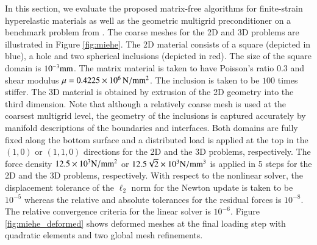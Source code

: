 \documentclass[AMA,STIX1COL]{WileyNJD-v2}
\begin{document}
In this section, we evaluate the proposed matrix-free algorithms for finite-strain hyperelastic materials as well as the geometric multigrid preconditioner on a benchmark problem from \cite{Miehe2007}. The coarse meshes for the 2D and 3D problems are illustrated in Figure \ref{fig:miehe}. The 2D material consists of a square (depicted in blue), a hole and two spherical inclusions (depicted in red). The size of the square domain is $10^{-3} \rm{mm}$.
The matrix material is taken to have Poisson's ratio $0.3$ and shear modulus $\mu=0.4225 \times 10^6\, \rm{N/mm^2}$. The inclusion is taken to be $100$ times stiffer.
The 3D material is obtained by extrusion of the 2D geometry into the third dimension.
Note that although a relatively coarse mesh is used at the coarsest multigrid level, the geometry of the inclusions is captured accurately by manifold descriptions of the boundaries and interfaces.
Both domains are fully fixed along the bottom surface and a distributed load is applied at the top in the $(1,0)$ or $(1,1,0)$ directions for the 2D and the 3D problems, respectively.
The force density $12.5 \times 10^3 \rm{N/mm^2}$ or $12.5 \sqrt{2} \times 10^3 \rm{N/mm^3}$ is applied in 5 steps for the 2D and the 3D problems, respectively.
With respect to the nonlinear solver, the displacement tolerance of the $\mathcal{\ell}_2$ norm for the Newton update is taken to be $10^{-5}$ whereas the relative and absolute tolerances for the residual forces is $10^{-8}$. The relative convergence criteria for the linear solver is $10^{-6}$.
%
Figure \ref{fig:miehe_deformed} shows deformed meshes at the final loading step with quadratic elements and two global mesh refinements.
%
\end{document}
